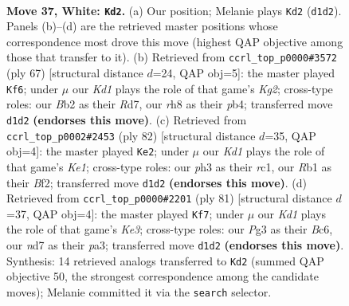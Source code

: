 \documentclass[11pt]{article}
\begin{document}
\clearpage

\begin{figure}[p]\centering
\begin{subfigure}{0.46\textwidth}\centering
\resizebox{\linewidth}{!}{%
\newchessgame
\chessboard[
  setfen={7r/3n1k2/8/8/p1p1p3/P1P3Pp/1BP2P1P/1R1K4 w - - 7 37},
  showmover=false,
  pgfstyle=straightmove, color=movearrow, markmove={d1-d2}
]}
\caption{}
\end{subfigure}\hfill
\begin{subfigure}{0.46\textwidth}\centering
\resizebox{\linewidth}{!}{%
\newchessgame
\chessboard[
  setfen={8/3r1pk1/1p2p3/6p1/1PPbP2p/3N1P1P/R7/4K3 b - - 4 34},
  showmover=false,
  pgfstyle=straightmove, color=movearrow, markmove={g7-f6}
]}
\caption{}
\end{subfigure}
\\[4pt]
\begin{subfigure}{0.46\textwidth}\centering
\resizebox{\linewidth}{!}{%
\newchessgame
\chessboard[
  setfen={6k1/R7/6pp/8/1pP1bpPP/1P6/P4B2/2r1K3 w - - 5 42},
  showmover=false,
  pgfstyle=straightmove, color=movearrow, markmove={e1-e2}
]}
\caption{}
\end{subfigure}\hfill
\begin{subfigure}{0.46\textwidth}\centering
\resizebox{\linewidth}{!}{%
\newchessgame
\chessboard[
  setfen={4r3/1pB5/p1b1kp2/3p2p1/3P2P1/P4P2/P5K1/4R3 b - - 3 41},
  showmover=false,
  pgfstyle=straightmove, color=movearrow, markmove={e6-f7}
]}
\caption{}
\end{subfigure}
\caption{\textbf{Move 37, White: \texttt{Kd2}.} (a) Our position; Melanie plays \texttt{Kd2} (\texttt{d1d2}). Panels (b)--(d) are the retrieved master positions whose correspondence most drove this move (highest QAP objective among those that transfer to it). (b) Retrieved from \texttt{ccrl\_top\_p0000\#3572} (ply 67) [structural distance $d$=24, QAP obj=5]: the master played \texttt{Kf6}; under $\mu$ our \emph{Kd1} plays the role of that game's \emph{Kg2}; cross-type roles: our \emph{B}b2 as their \emph{R}d7, our \emph{r}h8 as their \emph{p}b4; transferred move \texttt{d1d2} \textbf{(endorses this move)}. (c) Retrieved from \texttt{ccrl\_top\_p0002\#2453} (ply 82) [structural distance $d$=35, QAP obj=4]: the master played \texttt{Ke2}; under $\mu$ our \emph{Kd1} plays the role of that game's \emph{Ke1}; cross-type roles: our \emph{p}h3 as their \emph{r}c1, our \emph{R}b1 as their \emph{B}f2; transferred move \texttt{d1d2} \textbf{(endorses this move)}. (d) Retrieved from \texttt{ccrl\_top\_p0000\#2201} (ply 81) [structural distance $d$=37, QAP obj=4]: the master played \texttt{Kf7}; under $\mu$ our \emph{Kd1} plays the role of that game's \emph{Ke3}; cross-type roles: our \emph{P}g3 as their \emph{B}c6, our \emph{n}d7 as their \emph{p}a3; transferred move \texttt{d1d2} \textbf{(endorses this move)}. Synthesis: 14 retrieved analogs transferred to \texttt{Kd2} (summed QAP objective 50, the strongest correspondence among the candidate moves); Melanie committed it via the \texttt{search} selector.}
\label{fig:thought-m72}
\end{figure}
\end{document}
